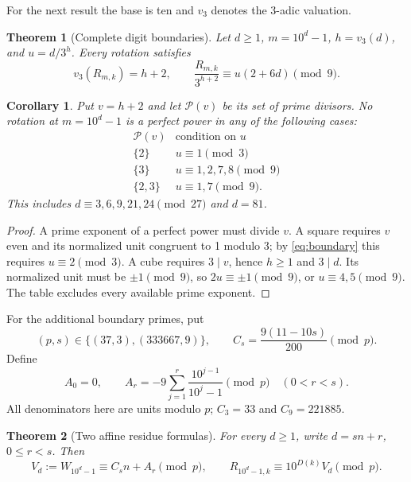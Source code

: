 \documentclass[10pt]{article}
\newtheorem{theorem}{Theorem}
\newtheorem{corollary}{Corollary}
\begin{document}
For the next result the base is ten and $v_3$ denotes the 3-adic valuation.
\begin{theorem}[Complete digit boundaries]\label{thm:boundary}
Let $d\ge1$, $m=10^d-1$, $h=v_3(d)$, and $u=d/3^h$. Every rotation satisfies
\begin{equation}\label{eq:boundary}
 v_3(R_{m,k})=h+2,\qquad
 \frac{R_{m,k}}{3^{h+2}}\equiv u(2+6d)\pmod9.
\end{equation}
\end{theorem}

\begin{corollary}\label{cor:exclude}
Put $v=h+2$ and let $\mathcal P(v)$ be its set of prime divisors.
No rotation at $m=10^d-1$ is a perfect power in any of the following cases:
\[
\begin{array}{c|c}
 \mathcal P(v)&\text{condition on }u\\ \hline
 \{2\}&u\equiv1\pmod3\\
 \{3\}&u\equiv1,2,7,8\pmod9\\
 \{2,3\}&u\equiv1,7\pmod9.
\end{array}
\]
This includes $d\equiv3,6,9,21,24\pmod{27}$ and $d=81$.
\end{corollary}
\begin{proof}
A prime exponent of a perfect power must divide $v$. A square requires
$v$ even and its normalized unit congruent to 1 modulo 3; by
\eqref{eq:boundary} this requires $u\equiv2\pmod3$.
A cube requires $3\mid v$, hence $h\ge1$ and $3\mid d$.
Its normalized unit must be $\pm1\pmod9$, so $2u\equiv\pm1\pmod9$,
or $u\equiv4,5\pmod9$. The table excludes every available prime exponent.
\end{proof}

For the additional boundary primes, put
\[
 (p,s)\in\{(37,3),(333667,9)\},\qquad
 C_s=\frac{9(11-10s)}{200}\pmod p.
\]
Define
\[
 A_0=0,\qquad
 A_r=-9\sum_{j=1}^r\frac{10^{j-1}}{10^j-1}\pmod p\quad(0<r<s).
\]
All denominators here are units modulo $p$; $C_3=33$ and $C_9=221885$.

\begin{theorem}[Two affine residue formulas]\label{thm:other-primes}
For every $d\ge1$, write $d=sn+r$, $0\le r<s$. Then
\begin{equation}\label{eq:affine-boundary}
 V_d:=W_{10^d-1}\equiv C_sn+A_r\pmod p,\qquad
 R_{10^d-1,k}\equiv10^{D(k)}V_d\pmod p.
\end{equation}
\end{theorem}
\end{document}

